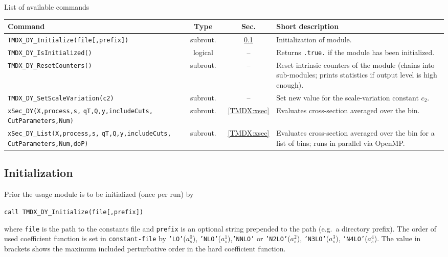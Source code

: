 \documentclass[prd,nofootinbib,eqsecnum,final]{revtex4}
\renewcommand{\(}{\left(}
\renewcommand{\)}{\right)}
\renewcommand{\[}{\left[}
\renewcommand{\]}{\right]}
\begin{document}
\begin{center}
List of available commands
\\
\begin{tabular}{||p{6cm}|c|c|p{8cm}||}
\hline\hline
Command & ~~Type~~& ~~Sec.~~ & Short description
\\\hline
\texttt{TMDX{\_}DY{\_}Initialize(file[,prefix])} & subrout. & \ref{TMDX:init} & Initialization of module.
\\\hline
\texttt{TMDX{\_}DY{\_}IsInitialized()} & logical & -- & Returns \texttt{.true.} if the module has been initialized.
\\\hline
\texttt{TMDX{\_}DY{\_}ResetCounters()} & subrout. & -- & Reset intrinsic counters of the module (chains into sub-modules; prints statistics if output level is high enough).
\\\hline
\texttt{TMDX{\_}DY{\_}SetScaleVariation(c2)} & subrout. & -- & Set new value for the scale-variation constant $c_2$.
\\\hline
\texttt{xSec\_DY(X,process,s,} \texttt{qT,Q,y,includeCuts,} \texttt{CutParameters,Num)} &subrout. &\ref{TMDX:xsec} & Evaluates cross-section averaged over the bin.
\\\hline
\texttt{xSec\_DY\_List(X,process,s,} \texttt{qT,Q,y,includeCuts,} \texttt{CutParameters,Num,doP)} &subrout. &\ref{TMDX:xsec} & Evaluates cross-section averaged over the bin for a list of bins; runs in parallel via OpenMP.
\\\hline\hline
\end{tabular}
\end{center}

\subsection{Initialization}
\label{TMDX:init}

Prior the usage module is to be initialized (once per run) by

\texttt{call TMDX\_DY{\_}Initialize(file[,prefix])}

where \texttt{file} is the path to the constants file and \texttt{prefix} is an optional string prepended to the path (e.g.\ a directory prefix). The order of used coefficient function is set in \texttt{constant-file} by \texttt{'LO'}($a_s^0$), \texttt{'NLO'}($a_s^1$),\texttt{'NNLO'} or \texttt{'N2LO'}($a_s^2$), \texttt{'N3LO'}($a_s^3$), \texttt{'N4LO'}($a_s^4$). The value in brackets shows the maximum included perturbative order in the hard coefficient function.
\end{document}
